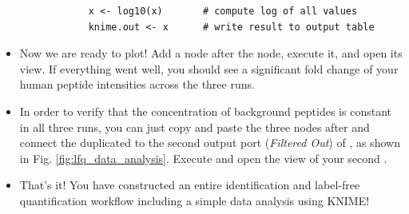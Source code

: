 \begin{itemize}
\begin{lstlisting}
            x <- log10(x)       # compute log of all values
            knime.out <- x      # write result to output table
        \end{lstlisting}
    \item Now we are ready to plot! Add a  node  after the  node, execute it, and open its view. If everything went well, you should see a significant fold change of your human peptide intensities across the three runs.
    \item In order to verify that the concentration of background peptides is constant in all three runs, you can just copy and paste the three nodes after  and connect the duplicated  to the second output port (\textit{Filtered Out}) of , as shown in Fig. \ref{fig:lfq_data_analysis}. Execute and open the view of your second .
    \item That's it! You have constructed an entire identification and label-free quantification workflow including a simple data analysis using KNIME!
\end{itemize}
 


